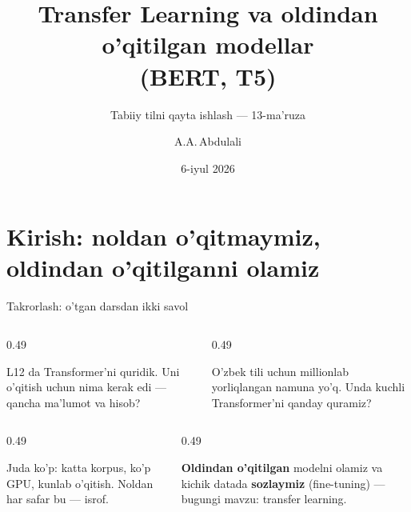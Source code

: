 \documentclass[aspectratio=169,11pt]{beamer}
\title[Transfer Learning]{Transfer Learning va oldindan o'qitilgan modellar\\ (BERT, T5)}
\subtitle{Tabiiy tilni qayta ishlash --- 13-ma'ruza}
\author[A.A.\,Abdulali]{A.A.\,Abdulali}
\date{6-iyul 2026}
\institute{11:00--12:20 \quad$\cdot$\quad mavzu \textnumero{}13}
\begin{document}

\maketitle

\section[Kirish]{Kirish: noldan o'qitmaymiz, oldindan o'qitilganni olamiz}

\begin{frame}{Takrorlash: o'tgan darsdan ikki savol}
  \begin{columns}[T]
    \begin{column}{0.49\textwidth}
      \begin{tcolorbox}[warnbox,title=1-savol]
        \small
        L12 da Transformer'ni quridik. Uni o'qitish uchun nima kerak edi ---
        qancha ma'lumot va hisob?
      \end{tcolorbox}
    \end{column}
    \begin{column}{0.49\textwidth}
      \begin{tcolorbox}[warnbox,title=2-savol]
        \small
        O'zbek tili uchun millionlab yorliqlangan namuna yo'q. Unda kuchli
        Transformer'ni qanday quramiz?
      \end{tcolorbox}
    \end{column}
  \end{columns}
  \pause
  \vspace{4pt}
  \begin{columns}[T]
    \begin{column}{0.49\textwidth}
      \begin{tcolorbox}[okbox,title=1-javob]
        \small
        Juda ko'p: katta korpus, ko'p GPU, kunlab o'qitish. Noldan har safar
        bu --- isrof.
      \end{tcolorbox}
    \end{column}
    \begin{column}{0.49\textwidth}
      \begin{tcolorbox}[okbox,title=2-javob]
        \small
        \textbf{Oldindan o'qitilgan} modelni olamiz va kichik datada
        \textbf{sozlaymiz} (fine-tuning) --- bugungi mavzu: transfer learning.
      \end{tcolorbox}
    \end{column}
  \end{columns}
\end{frame}
\end{document}
